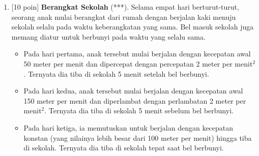 \documentclass[12pt, a4paper]{article}\usepackage[utf8]{inputenc}
\theoremstyle{definition}
\theoremstyle{definition}
\begin{document}
\begin{enumerate}
\begin{center}
			\end{center}
	
		\pagebreak
		
		\item $[$10 poin$]$ \textbf{Berangkat Sekolah} (***). Selama empat hari berturut-turut, seorang anak mulai berangkat dari rumah dengan
		berjalan kaki menuju sekolah selalu pada waktu keberangkatan yang sama. Bel masuk sekolah juga memang diatur untuk berbunyi pada waktu yang selalu sama.
		
		\begin{itemize}
			
			\item Pada hari pertama, anak tersebut mulai berjalan dengan kecepatan awal 50 meter per menit dan dipercepat dengan percepatan 2 meter per menit$^2$. Ternyata dia tiba di sekolah 5 menit setelah bel berbunyi.
			
			\item Pada hari kedua, anak tersebut mulai berjalan dengan kecepatan awal 150 meter per menit dan diperlambat dengan perlambatan 2 meter per menit$^2$. Ternyata dia tiba di sekolah 5 menit sebelum bel berbunyi.
			
			\item Pada hari ketiga, ia memutuskan untuk berjalan dengan kecepatan konstan (yang nilainya lebih besar dari 100 meter per menit) hingga tiba di sekolah. Ternyata dia tiba di sekolah tepat saat bel berbunyi.
			

\end{itemize}
\end{enumerate}
\end{document}
